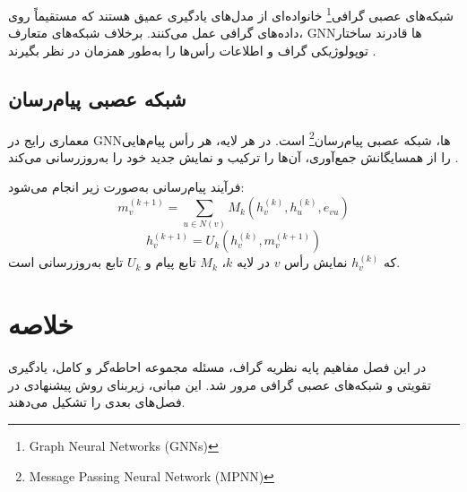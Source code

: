 شبکه‌های عصبی گرافی\footnote{Graph Neural Networks (GNNs)} خانواده‌ای از مدل‌های یادگیری عمیق هستند که مستقیماً روی داده‌های گرافی عمل می‌کنند. برخلاف شبکه‌های متعارف، GNNها قادرند ساختار توپولوژیکی گراف و اطلاعات رأس‌ها را به‌طور همزمان در نظر بگیرند \cite{scarselli2008graph, gilmer2017mpnn}.

\subsection{شبکه عصبی پیام‌رسان}

معماری رایج در GNNها، شبکه عصبی پیام‌رسان\footnote{Message Passing Neural Network (MPNN)} است. در هر لایه، هر رأس پیام‌هایی را از همسایگانش جمع‌آوری، آن‌ها را ترکیب و نمایش جدید خود را به‌روزرسانی می‌کند \cite{gilmer2017mpnn}.

فرآیند پیام‌رسانی به‌صورت زیر انجام می‌شود:
$$
m_v^{(k+1)} = \sum_{u \in N(v)} M_k(h_v^{(k)}, h_u^{(k)}, e_{vu})
$$
$$
h_v^{(k+1)} = U_k(h_v^{(k)}, m_v^{(k+1)})
$$
که $h_v^{(k)}$ نمایش رأس $v$ در لایه $k$، $M_k$ تابع پیام و $U_k$ تابع به‌روزرسانی است.

\section{خلاصه}

در این فصل مفاهیم پایه نظریه گراف، مسئله مجموعه احاطه‌گر و کامل، یادگیری تقویتی و شبکه‌های عصبی گرافی مرور شد. این مبانی، زیربنای روش پیشنهادی در فصل‌های بعدی را تشکیل می‌دهند.
